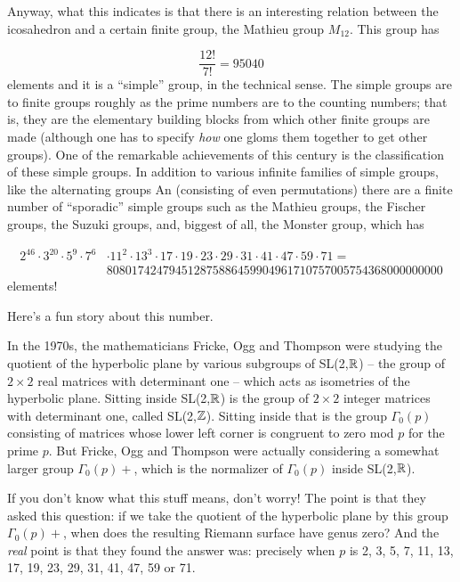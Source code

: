 Anyway, what this indicates is that there is an interesting relation between the icosahedron and a certain finite group, the Mathieu group $M_{12}$. This group has

\[ \frac{12!}{7!} = 95040 \]
elements and it is a ``simple'' group, in the technical sense. The simple groups are to finite groups roughly as the prime numbers are to the counting numbers; that is, they are the elementary building blocks from which other finite groups are made (although one has to specify \emph{how} one gloms them together to get other groups). One of the remarkable achievements of this century is the classification of these simple groups. In addition to various infinite families of simple groups, like the alternating groups An (consisting of even permutations) there are a finite number of ``sporadic'' simple groups such as the Mathieu groups, the Fischer groups, the Suzuki groups, and, biggest of all, the Monster group, which has

\begin{align*} 2^{46} \cdot 3^{20} \cdot 5^9 \cdot 7^6 & \cdot 11^2 \cdot 13^3 \cdot 17 \cdot 19 \cdot 23 \cdot 29 \cdot 31 \cdot 41 \cdot 47 \cdot 59 \cdot 71 = \\
& 808017424794512875886459904961710757005754368000000000 \end{align*}
elements!

Here's a fun story about this number.

In the 1970s, the mathematicians Fricke, Ogg and Thompson were studying the quotient of the hyperbolic plane by various subgroups of SL(2,$\mathbb R$) -- the group of $2 \times 2$ real matrices with determinant one -- which acts as isometries of the hyperbolic plane. Sitting inside SL(2,$\mathbb R$) is the group of $2 \times 2$ integer matrices with determinant one, called SL(2,$\mathbb Z$). Sitting inside that is the group $\Gamma_0(p)$ consisting of matrices whose lower left corner is congruent to zero mod $p$ for the prime $p$. But Fricke, Ogg and Thompson were actually considering a somewhat larger group $\Gamma_0(p)+$, which is the normalizer of $\Gamma_0(p)$ inside SL(2,$\mathbb R$).

If you don't know what this stuff means, don't worry! The point is that they asked this question: if we take the quotient of the hyperbolic plane by this group $\Gamma_0(p)+$, when does the resulting Riemann surface have genus zero? And the \emph{real} point is that they found the answer was: precisely when $p$ is 2, 3, 5, 7, 11, 13, 17, 19, 23, 29, 31, 41, 47, 59 or 71.

